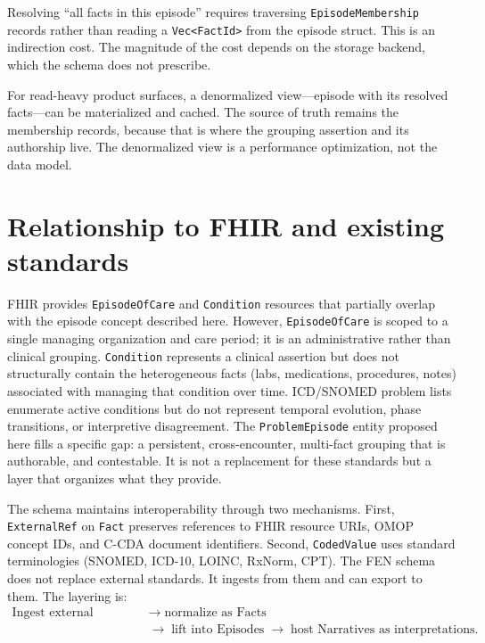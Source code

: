 \documentclass[11pt]{article}
\begin{document}
Resolving ``all facts in this episode'' requires traversing
\texttt{EpisodeMembership} records rather than reading a
\texttt{Vec<FactId>} from the episode struct. This is an indirection cost.
The magnitude of the cost depends on the storage backend, which the schema
does not prescribe.

For read-heavy product surfaces, a denormalized view---episode with its
resolved facts---can be materialized and cached. The source of truth remains
the membership records, because that is where the grouping assertion and its
authorship live. The
denormalized view is a performance optimization, not the data model.




\section{Relationship to FHIR and existing standards}

FHIR provides \texttt{EpisodeOfCare} and \texttt{Condition} resources that
partially overlap with the episode concept described here. However,
\texttt{EpisodeOfCare} is scoped to a single managing organization and care
period; it is an administrative rather than clinical grouping.
\texttt{Condition} represents a clinical assertion but does not structurally
contain the heterogeneous facts (labs, medications, procedures, notes)
associated with managing that condition over time. ICD/SNOMED problem lists
enumerate active conditions but do not represent temporal evolution, phase
transitions, or interpretive disagreement. The \texttt{ProblemEpisode} entity
proposed here fills a specific gap: a persistent, cross-encounter, multi-fact
grouping that is authorable, and contestable. It is not a
replacement for these standards but a layer that organizes what they provide.

The schema maintains interoperability through two mechanisms. First,
\texttt{ExternalRef} on \texttt{Fact} preserves references to FHIR resource
URIs, OMOP concept IDs, and C-CDA document identifiers. Second,
\texttt{CodedValue} uses standard terminologies (SNOMED, ICD-10, LOINC,
RxNorm, CPT). The FEN schema does not replace external standards. It ingests
from them and can export to them. The layering is:
\[
\begin{aligned}
\text{Ingest external standards} &\;\rightarrow\; \text{normalize as Facts} \\
&\;\rightarrow\; \text{lift into Episodes}
  \;\rightarrow\; \text{host Narratives as interpretations.}
\end{aligned}
\]
\end{document}
